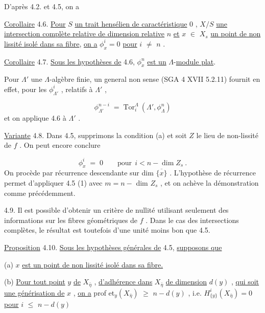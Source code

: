D'après 4.2. et 4.5, on a

\underline{Corollaire} 4.6.  \underline{Pour}  $S$  \underline{un trait hensélien de caractéristique} 0 ,  $X/S$  \underline{une intersection complète relative de dimension relative}  $n$  \underline{et}  $x$ $\in$ $X_s$  \underline{un point de non lissité isolé dans sa fibre}, \underline{on a}  $\phi^i_x = 0$  \underline{pour}  $i$ $\neq$ $n$ .

\underline{Corollaire} 4.7.  \underline{Sous les hypothèses de} 4.6,  $\phi^n_x$  \underline{est un}  $\Lambda$-\underline{module plat}.

Pour  $\Lambda'$  une $\Lambda$-algèbre finie, un general non sense (SGA 4 XVII 5.2.11) fournit en effet, pour les  $\phi^i_{\Lambda'}$ , relatifs à  $\Lambda'$ ,



\begin{equation*}
\phi^{n-i}_{\Lambda'} \;=\; \mathrm{Tor}^{\Lambda}_{i}\ (\Lambda',\phi^n_{\Lambda})
\end{equation*}
et on applique 4.6 à  $\Lambda'$  .

\underline{Variante} 4.8.  Dans 4.5, supprimons la condition (a) et soit  $Z$  le lieu de non-lissité de  $f$ . On peut encore conclure

\begin{equation*}
\phi^i_x \;=\; 0 \qquad \text{pour}\ \ i < n - \dim Z_s\ .
\end{equation*}
On procède par récurrence descendante sur  dim $\overline{\{x\}}$ . L'hypothèse de récurrence permet d'appliquer 4.5 (1) avec  $m = n -$ dim $Z_s$ , et on achève la démonstration comme précédemment.

4.9.  Il est possible d'obtenir un critère de nullité utilisant seulement des informations sur les fibres géométriques de  $f$ . Dans le cas des intersections complètes, le résultat est toutefois d'une unité moins bon que 4.5.

\underline{Proposition} 4.10.  \underline{Sous les hypothèses générales de} 4.5, \underline{supposons que}

(a)  $x$  \underline{est un point de non lissité isolé dans sa fibre.}

(b) \underline{Pour tout point}  $y$  \underline{de}  $X_{\bar{\eta}}$  , \underline{d'adhérence dans}  $X_{\bar{\eta}}$  \underline{de dimension} $d(y)$ , \underline{qui soit une générisation de}  $x$ , \underline{on a}  prof et$_y(X_{\bar{\eta}})$ $\geqslant$ $n - d(y)$ ,  i.e. $H^i_{\{y\}}(X_{\bar{\eta}}) = 0$ \underline{pour}  $i$ $\leqslant$ $n - d(y)$

